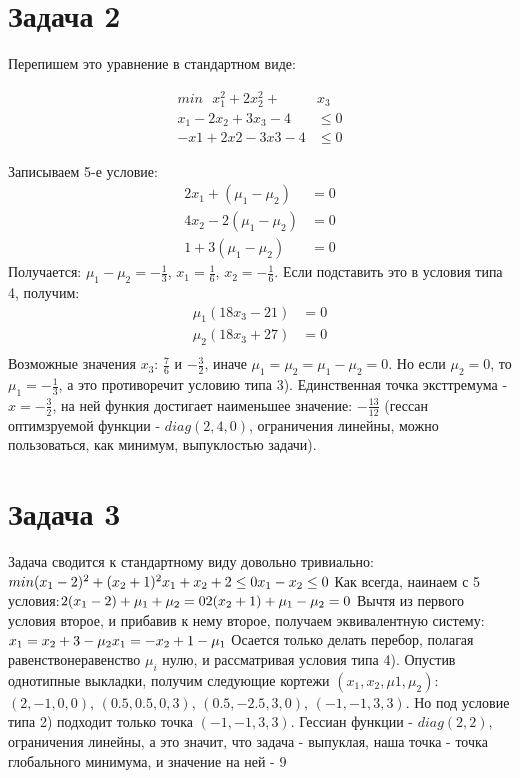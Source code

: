 \documentclass{article}
\begin{document}
\section{Задача 2}
Перепишем это уравнение в стандартном виде:

\begin{align*}
min \,\,\,\, x_1^2 + 2x_2^2 + &x_3 \\
x_1 - 2x_2 + 3x_3 - 4 &\leq 0 \\
-x1 + 2x2 - 3x3 - 4 &\leq 0
\end{align*}

Записываем 5-е условие:
\begin{align*}
2x_1 + (\mu_1 - \mu_2) &= 0 \\
4x_2 - 2(\mu_1 - \mu_2) &= 0 \\
1  + 3(\mu_1 - \mu_2) &= 0
\end{align*}
Получается: $\displaystyle \mu_1 - \mu_2 = -\frac{1}{3}$, $\displaystyle x_1 = \frac{1}{6}$, $\displaystyle x_2 = -\frac{1}{6}$.
Если подставить это в условия типа 4, получим:
\begin{align*}
\mu_1(18x_3 - 21)&=0 \\
\mu_2(18x_3 + 27)&=0 \\
\end{align*}
Возможные значения $x_3$: $\displaystyle \frac{7}{6}$ и $\displaystyle -\frac{3}{2}$, иначе $\mu_1 = \mu_2 = \mu_1 - \mu_2 = 0$. Но если $\mu_2 = 0$, то $\displaystyle \mu_1 = -\frac{1}{3}$, а это противоречит условию типа 3). Единственная точка эксттремума - $\displaystyle x = -\frac{3}{2}$, на ней функия достигает наименьшее значение: $\displaystyle -\frac{13}{12}$ (гессан оптимзруемой функции - $diag(2, 4, 0)$, ограничения линейны, можно пользоваться, как минимум, выпуклостью задачи).
\section{Задача 3}
Задача сводится к стандартному виду довольно тривиально:$\\
min (x_1 - 2)^2 + (x_2 + 1)^2  \\
x_1 + x_2 + 2 \leq 0 \\
x_1 - x_2 \leq 0 \\
$
Как всегда, наинаем с 5 условия:$ \\
2(x_1 - 2) + \mu_1 + \mu_2 = 0 \\
2(x_2 + 1) + \mu_1 - \mu_2 = 0 \\
$
Вычтя из первого условия второе, и прибавив к нему второе, получаем эквивалентную систему: $ \\
x_1 = x_2 + 3 -\mu_2 \\
x_1 = -x_2 + 1 -\mu_1 \\
$
Осается только делать перебор, полагая равенствонеравенство $\mu_i$ нулю, и рассматривая условия типа 4). Опустив однотипные выкладки, получим следующие кортежи $(x_1, x_2, \mu1 , \mu_2)$: $(2, -1, 0, 0)$, $(0.5, 0.5, 0, 3)$, $(0.5, -2.5, 3, 0)$, $(-1, -1, 3, 3)$. Но под условие типа 2) подходит только точка $(-1, -1, 3, 3)$. Гессиан функции - $diag(2, 2)$, ограничения линейны, а это значит, что задача - выпуклая, наша точка - точка глобального минимума, и значение на ней - $9$
\end{document}
